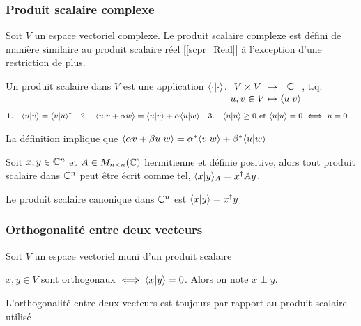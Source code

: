 \subsubsection{Produit scalaire complexe}
Soit $V$ un espace vectoriel complexe. Le produit scalaire complexe est défini de manière
similaire au produit scalaire réel [\ref{scpr_Real}] à l'exception d'une restriction de plus.
\begin{definition}
      Un produit scalaire dans $V$ est une application $\myfunc{\scpr{\cdot}{\cdot}}{V \times V}{\C}{u, v \in V}{\scpr{u}{v}}$, t.q.
      \begin{align*}
            &1. \quad \langle u \lvert v \rangle = \langle v \lvert u \rangle^*& &2. \quad \langle u \lvert v + \alpha w \rangle = \langle u \lvert v \rangle + \alpha \langle u \lvert w \rangle& &3. \quad \langle u \lvert u \rangle \geq 0 \ \text{et} \ \langle u \lvert u \rangle = 0 \iff u = 0&
      \end{align*}
\end{definition}
\begin{remark}
      La définition implique que $\langle \alpha v + \beta u \lvert w \rangle = \alpha^* \langle v \lvert w \rangle + \beta^* \langle u \lvert w \rangle$
\end{remark}
\begin{lemma}
      Soit $x,y \in \mathbb{C}^n$ et $A \in M_{n \times n}(\mathbb{C})$ hermitienne et définie positive, alors tout produit scalaire dans $\mathbb{C}^n$ 
      peut être écrit comme tel, $\langle x \lvert y \rangle_A = x^\dagger A y$.
\end{lemma}
\begin{definition}
      Le produit scalaire canonique dans $\mathbb{C}^n$ est $\langle x \lvert y \rangle = x^\dagger y$
\end{definition}

\subsubsection{Orthogonalité entre deux vecteurs}
Soit $V$ un espace vectoriel muni d'un produit scalaire
\begin{definition}
      $x, y \in V$ sont orthogonaux $\iff \langle x \lvert y \rangle = 0$. Alors on note $x \perp y$.
\end{definition}
\begin{remark}
      L'orthogonalité entre deux vecteurs est toujours par rapport au produit scalaire utilisé
\end{remark}

